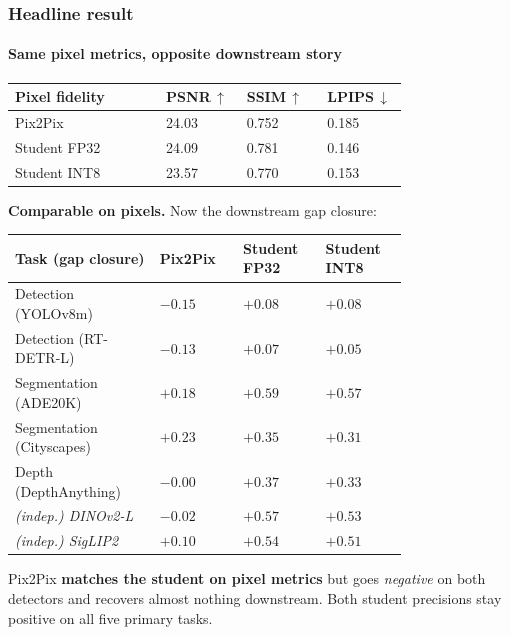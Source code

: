 \documentclass[
	aspectratio=169,
	t,
	onlytextwidth,
	10pt,
]{beamer}
\newcommand{\up}[1]{\textcolor{GoodGreen}{#1}}
\newcommand{\dn}[1]{\textcolor{BadRed}{#1}}
\begin{document}

\begin{frame}
	\frametitle{Headline result}
	\framesubtitle{Same pixel metrics, opposite downstream story}

	\centering
	\scriptsize

	\begin{tabular}{L{0.30\linewidth} C{0.16\linewidth} C{0.16\linewidth} C{0.16\linewidth}}
		\toprule
		\textbf{Pixel fidelity} & \textbf{PSNR\,$\uparrow$} & \textbf{SSIM\,$\uparrow$} & \textbf{LPIPS\,$\downarrow$}\\
		\midrule
		Pix2Pix       & 24.03 & 0.752 & 0.185\\
		Student FP32  & 24.09 & 0.781 & 0.146\\
		Student INT8  & 23.57 & 0.770 & 0.153\\
		\bottomrule
	\end{tabular}

	\smallskip
	{\footnotesize\textbf{Comparable on pixels.} Now the downstream gap closure:}
	\smallskip

	\begin{tabular}{L{0.30\linewidth} C{0.16\linewidth} C{0.16\linewidth} C{0.16\linewidth}}
		\toprule
		\textbf{Task (gap closure)} & \textbf{Pix2Pix} & \textbf{Student FP32} & \textbf{Student INT8}\\
		\midrule
		Detection (YOLOv8m)     & \dn{$-0.15$} & \up{$+0.08$} & \up{$+0.08$}\\
		Detection (RT-DETR-L)   & \dn{$-0.13$} & \up{$+0.07$} & \up{$+0.05$}\\
		Segmentation (ADE20K)   & \up{$+0.18$} & \up{$+0.59$} & \up{$+0.57$}\\
		Segmentation (Cityscapes) & \up{$+0.23$} & \up{$+0.35$} & \up{$+0.31$}\\
		Depth (DepthAnything)   & \dn{$-0.00$} & \up{$+0.37$} & \up{$+0.33$}\\
		\midrule
		\emph{(indep.) DINOv2-L}   & \dn{$-0.02$} & \up{$+0.57$} & \up{$+0.53$}\\
		\emph{(indep.) SigLIP2}    & \up{$+0.10$} & \up{$+0.54$} & \up{$+0.51$}\\
		\bottomrule
	\end{tabular}

	\smallskip
	{\footnotesize Pix2Pix \textbf{matches the student on pixel metrics} but goes \emph{negative} on both detectors and recovers almost nothing downstream. Both student precisions stay positive on all five primary tasks.}
\end{frame}
\end{document}
